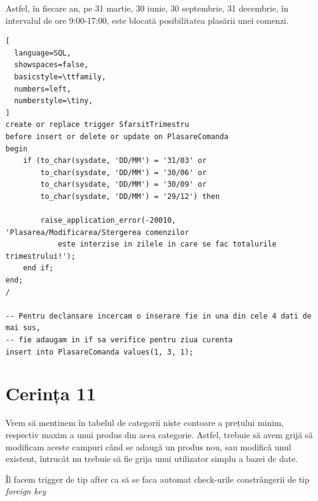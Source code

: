 \documentclass[12pt]{article}
\begin{document}
Astfel, în fiecare an, pe 31 martie, 30 iunie, 30 septembrie, 31 decembrie,
în intervalul de ore 9:00-17:00, este blocată posibilitatea plasării unei comenzi.

\vspace{0.5em}

\begin{lstlisting}[
  language=SQL,
  showspaces=false,
  basicstyle=\ttfamily,
  numbers=left,
  numberstyle=\tiny,
]
create or replace trigger SfarsitTrimestru
before insert or delete or update on PlasareComanda
begin
    if (to_char(sysdate, 'DD/MM') = '31/03' or
        to_char(sysdate, 'DD/MM') = '30/06' or
        to_char(sysdate, 'DD/MM') = '30/09' or
        to_char(sysdate, 'DD/MM') = '29/12') then
        
        raise_application_error(-20010, 'Plasarea/Modificarea/Stergerea comenzilor 
            este interzise in zilele in care se fac totalurile trimestrului!');
    end if;
end;
/

-- Pentru declansare incercam o inserare fie in una din cele 4 dati de mai sus,
-- fie adaugam in if sa verifice pentru ziua curenta
insert into PlasareComanda values(1, 3, 1);
\end{lstlisting}

\pagebreak

\section{Cerința 11}
Vrem să menținem în tabelul de categorii niște contoare a prețului minim,
respectiv maxim a unui produs din acea categorie.
Astfel, trebuie să avem grijă să modificam aceste campuri când se adaugă
un produs nou, sau modificâ unul existent, întrucât nu trebuie să fie
grija unui utilizator simplu a bazei de date.

Îl facem trigger de tip after ca să se faca automat check-urile constrângerii
de tip \textit{foreign key}

\vspace{0.5em}
\end{document}
